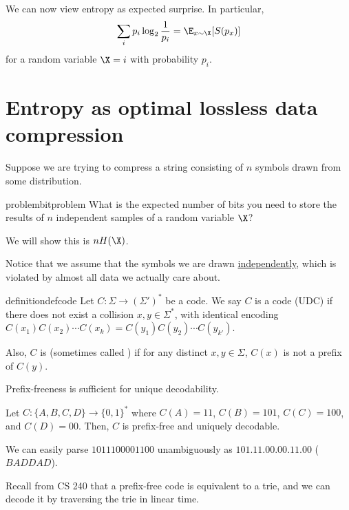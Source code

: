 \documentclass[class=co432,notes,tikz]{agony}
\begin{document}
We can now view entropy as expected surprise. In particular,
\[ \sum_i p_i \log_2\frac{1}{p_i} = \E_{x \sim \X}\qty[S(p_x)] \]
for a random variable $\X = i$ with probability $p_i$.

\section{Entropy as optimal lossless data compression}

Suppose we are trying to compress a string consisting of $n$
symbols drawn from some distribution.

\begin{restatable}{problem}{bitproblem}
  What is the expected number of bits you need to store the results of $n$ independent samples
  of a random variable $\X$?
\end{restatable}

We will show this is $nH(\X)$.

Notice that we assume that the symbols we are drawn \uline{independently},
which is violated by almost all data we actually care about.

\begin{restatable}{definition}{defcode}
  Let $C : \Sigma \to (\Sigma')^*$ be a code.
  We say $C$ is a  code (UDC) if there does not exist
  a collision $x, y \in \Sigma^*$,
  with identical encoding $C(x_1)C(x_2)\cdots C(x_k) = C(y_1)C(y_2)\cdots C(y_{k'})$.

  Also, $C$ is  (sometimes called )
  if for any distinct $x,y \in \Sigma$, $C(x)$ is not a prefix of $C(y)$.
\end{restatable}

\begin{prop}
  Prefix-freeness is sufficient for unique decodability.
\end{prop}

\begin{example}
  Let $C : \{A,B,C,D\} \to \{0,1\}^*$ where
  $C(A) = 11$, $C(B) = 101$, $C(C) = 100$, and $C(D) = 00$.
  Then, $C$ is prefix-free and uniquely decodable.

  We can easily parse $1011100001100$ unambiguously as $101.11.00.00.11.00$
  ($BADDAD$).
\end{example}

Recall from CS 240 that a prefix-free code is equivalent to a trie,
and we can decode it by traversing the trie in linear time.
\end{document}
